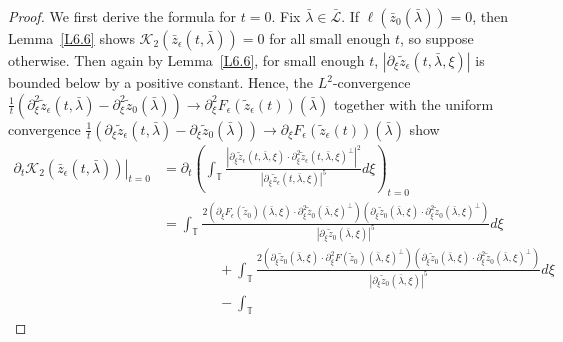 \documentclass[reqno,centertags,12pt]{amsart}
\theoremstyle{definition}
\numberwithin{equation}{section}
\newcommand{\abs}[1]{\left\lvert#1\right\rvert}
\newcommand{\bbT}{{\mathbb{T}}}
\begin{document}
\begin{proof}
    We first derive the formula for $t=0$. Fix $\bar{\lambda}\in\bar{\mathcal{L}}$.
    If $\ell(\bar{z}_{0}(\bar{\lambda})) = 0$, then
    Lemma~\ref{L6.6} shows
    $\mathcal{K}_{2}(\bar{z}_{\epsilon}(t,\bar{\lambda})) = 0$ for all small enough $t$,
    so suppose otherwise. Then again by
    Lemma~\ref{L6.6}, for small enough $t$,
    $\abs{\partial_{\xi}\tilde{z}_{\epsilon}(t,\bar{\lambda},\xi)}$
    is bounded below by a positive constant. Hence, the $L^{2}$-convergence
    $\frac{1}{t}\left(\partial_{\xi}^{2}\tilde{z}_{\epsilon}(t,\bar{\lambda})
    -\partial_{\xi}^{2}\tilde{z}_{0}(\bar{\lambda})\right)
    \to \partial_{\xi}^{2}F_{\epsilon}(\tilde{z}_{\epsilon}(t))(\bar{\lambda})$
    together with the uniform convergence
    $\frac{1}{t}\left(\partial_{\xi}\tilde{z}_{\epsilon}(t,\bar{\lambda})
    -\partial_{\xi}\tilde{z}_{0}(\bar{\lambda})\right)
    \to \partial_{\xi}F_{\epsilon}(\tilde{z}_{\epsilon}(t))(\bar{\lambda})$ show
    \begin{align*}
        \left.\partial_{t}\mathcal{K}_{2}(\bar{z}_{\epsilon}(t,\bar{\lambda}))\right|_{t=0}
        &=
        \partial_{t}\left(\int_{\bbT}
        \frac{\abs{
            \partial_{\xi}\tilde{z}_{\epsilon}(t,\bar{\lambda},\xi)
            \cdot\partial_{\xi}^{2}\tilde{z}_{\epsilon}(t,\bar{\lambda},\xi)^{\perp}
        }^{2}}
        {\abs{\partial_{\xi}\tilde{z}_{\epsilon}(t,\bar{\lambda},\xi)}^{5}}
        d\xi\right)_{t=0} \\
        &=
        \int_{\bbT}
        \frac{2\left(
            \partial_{\xi}F_{\epsilon}(\tilde{z}_{0})(\bar{\lambda},\xi)
            \cdot\partial_{\xi}^{2}\tilde{z}_{0}(\bar{\lambda},\xi)^{\perp}
        \right)
        \left(
            \partial_{\xi}\tilde{z}_{0}(\bar{\lambda},\xi)
            \cdot\partial_{\xi}^{2}\tilde{z}_{0}(\bar{\lambda},\xi)^{\perp}
        \right)}
        {\abs{\partial_{\xi}\tilde{z}_{0}(\bar{\lambda},\xi)}^{5}}
        d\xi \\
        &\quad\quad\quad\quad
        + \int_{\bbT}
        \frac{2\left(
            \partial_{\xi}\tilde{z}_{0}(\bar{\lambda},\xi)
            \cdot\partial_{\xi}^{2}F(\tilde{z}_{0})(\bar{\lambda},\xi)^{\perp}
        \right)
        \left(
            \partial_{\xi}\tilde{z}_{0}(\bar{\lambda},\xi)
            \cdot\partial_{\xi}^{2}\tilde{z}_{0}(\bar{\lambda},\xi)^{\perp}
        \right)}
        {\abs{\partial_{\xi}\tilde{z}_{0}(\bar{\lambda},\xi)}^{5}}
        d\xi \\
        &\quad\quad\quad\quad
        - \int_{\bbT}

\end{align*}
\end{proof}
\end{document}
